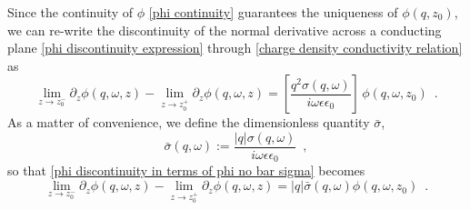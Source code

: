 \documentclass[submission, Phys]{SciPost}
\newcommand{\lb}{\left[}
\newcommand{\rb}{\right]}
\newcommand{\e}{\epsilon}
\begin{document}
Since the continuity of $\phi$ \eqref{phi continuity} guarantees the uniqueness of $\phi(q,z_0)$, we can re-write the discontinuity of the normal derivative across a conducting plane \eqref{phi discontinuity expression} through \eqref{charge density conductivity relation} as
\begin{equation}
    \label{phi discontinuity in terms of phi no bar sigma}
    \lim_{z\to z_0^-}\partial_z\phi(q,\omega,z) - \lim_{z\to z_0^+}\partial_z\phi(q,\omega,z) = \lb\frac{q^2\sigma(q,\omega)}{i\omega\e\e_0}\rb\,\phi(q,\omega,z_0)
    \,\,\,.
\end{equation}
As a matter of convenience, we define the dimensionless quantity $\bar\sigma$,
\begin{equation}
    \label{bar sigma def}
    \bar\sigma(q,\omega):=
    \frac{|q|\sigma(q,\omega)}{i\omega\e\e_0}
    \,\,\,,
\end{equation}
so that \eqref{phi discontinuity in terms of phi no bar sigma} becomes
\begin{equation}
    \label{phi discontinuity in terms of phi}
    \lim_{z\to z_0^-}\partial_z\phi(q,\omega,z) - \lim_{z\to z_0^+}\partial_z\phi(q,\omega,z) = |q|\bar\sigma(q,\omega)\phi(q,\omega,z_0)
    \,\,\,.
\end{equation}
\end{document}
